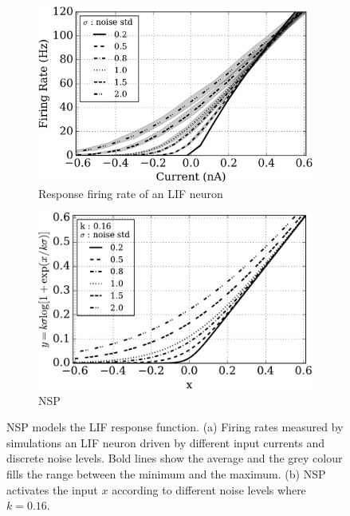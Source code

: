 \DIFdelend \DIFaddbegin \begin{figure}[tbh!]
		\DIFaddendFL \centering
		\begin{subfigure}[t]{0.48\textwidth}
			\includegraphics[width=\textwidth]{pics_iconip/siegert.png}
			\caption{Response firing rate of an LIF neuron}
		\end{subfigure}
		\begin{subfigure}[t]{0.48\textwidth}
			\includegraphics[width=\textwidth]{pics_iconip/4.pdf}
			\caption{NSP}
		\end{subfigure}
		\caption{
			NSP models the LIF response function.
			(a) Firing rates measured by simulations \DIFdelbeginFL {}\DIFdelendFL \DIFaddbeginFL {}\DIFaddendFL an LIF neuron driven by different input currents and discrete noise levels.
			Bold lines show the average and the grey colour fills the range between the minimum and the maximum.
			(b) NSP activates the input $x$ according to different noise levels where $k=0.16$.}
		\label{fig:nsp}
	\end{figure}

